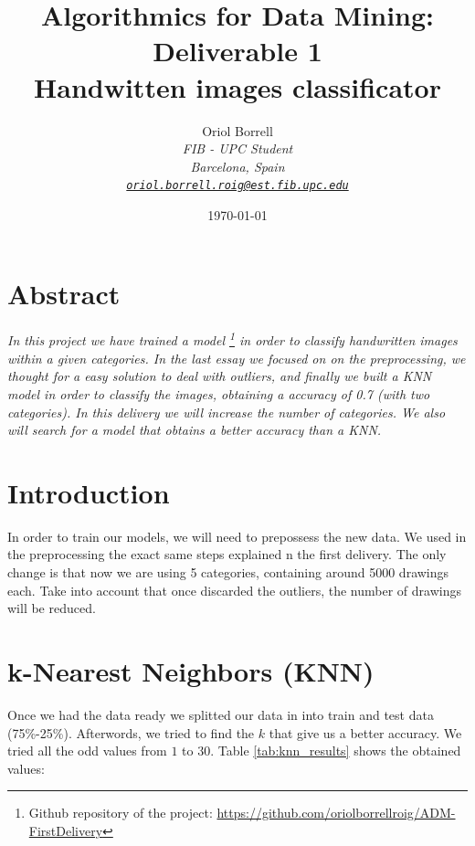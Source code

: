 \documentclass{article}
\title{
\textbf{Algorithmics for Data Mining: Deliverable 1\\} \Large{
    Handwitten images classificator}}
\author{Oriol Borrell\\
\textit{\small FIB - UPC Student} \\
\textit{\small Barcelona, Spain} \\
\textit{\texttt{\href{mailto:oriol.borrell.roig@est.fib.upc.edu}
{\small oriol.borrell.roig@est.fib.upc.edu}}}}
\date{\today}
\begin{document}
\maketitle

\section{Abstract}
\textit{
In this project we have trained a model \footnote{Github repository of the project: \url{https://github.com/oriolborrellroig/ADM-FirstDelivery}} in order to classify handwritten images within a given categories. In the last essay we focused on on the preprocessing, we thought for a easy solution to deal with outliers, and finally we built a KNN model in order to classify the images, obtaining a accuracy of 0.7 (with two categories). In this delivery we will increase the number of categories. We also will search for a model that obtains a better accuracy than a KNN.
}

\section{Introduction}
\label{Modeling}
In order to train our models, we will need to prepossess the new data. We used in the preprocessing the exact same steps explained n the first delivery. The only change is that now we are using 5 categories, containing around 5000 drawings each. Take into account that once discarded the outliers, the number of drawings will be reduced. 

\section{k-Nearest Neighbors (KNN)} 
\label{KNN}
Once we had the data ready we splitted our data in into train and test data (75\%-25\%). Afterwords, we tried to find the $k$ that give us a better accuracy. We tried all the odd values from $1$ to $30$. Table \ref{tab:knn_results} shows the obtained values:
\end{document}
